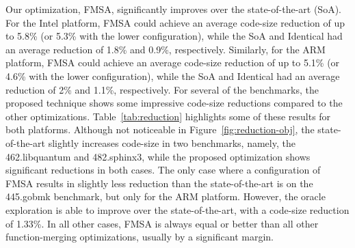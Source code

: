 Our optimization, FMSA, significantly improves over the state-of-the-art (SoA).
For the Intel platform, FMSA could achieve an average code-size reduction of up
to 5.8\% (or 5.3\% with the lower configuration), while the SoA and Identical
had an average reduction of 1.8\% and 0.9\%, respectively. 
Similarly, for the ARM platform, FMSA could achieve an average code-size
reduction of up to 5.1\% (or 4.6\% with the lower configuration), while the SoA
and Identical had an average reduction of 2\% and 1.1\%, respectively. 
For several of the benchmarks, the proposed technique shows some impressive
code-size reductions compared to the other optimizations.
Table~\ref{tab:reduction} highlights some of these results for both platforms.
Although not noticeable in Figure~\ref{fig:reduction-obj}, the state-of-the-art
slightly increases code-size in two benchmarks, namely, the 462.libquantum and
482.sphinx3, while the proposed optimization shows significant reductions in
both cases.
The only case where a configuration of FMSA results in slightly less reduction
than the state-of-the-art is on the 445.gobmk benchmark, but only for the ARM
platform.
However, the oracle exploration is able to improve over the state-of-the-art,
with a code-size reduction of 1.33\%.
In all other cases, FMSA is always equal or better than all other
function-merging optimizations, usually by a significant margin.

